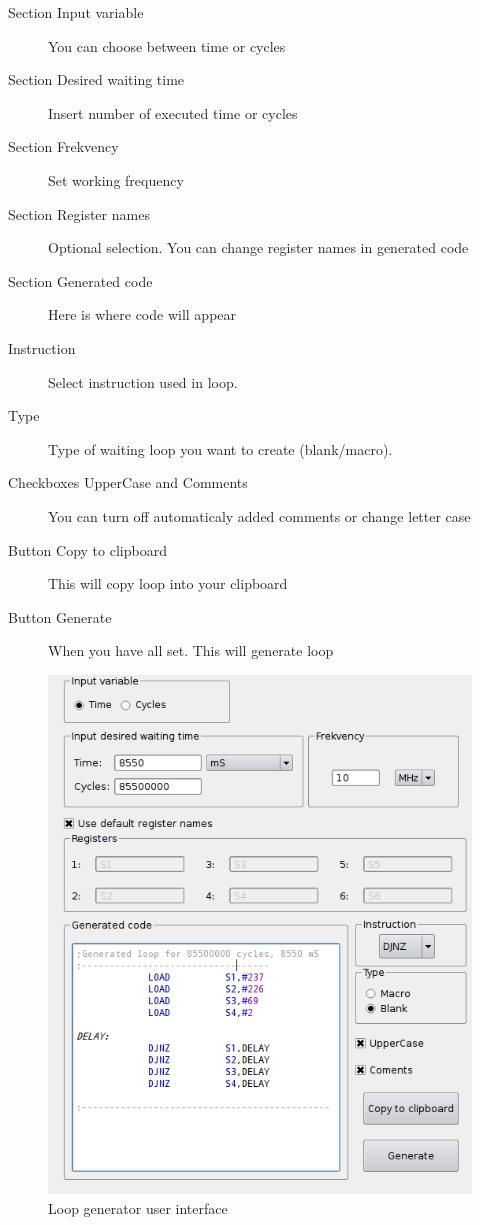     \begin{description}
        \item[Section Input variable] You can choose between time or cycles
        \item[Section Desired waiting time] Insert number of executed time or cycles
        \item[Section Frekvency] Set working frequency
        \item[Section Register names] Optional selection. You can change register names in generated code
        \item[Section Generated code] Here is where code will appear
        \item[Instruction] Select instruction used in loop.
        \item[Type] Type of waiting loop you want to create (blank/macro).
        \item[Checkboxes UpperCase and Comments]  You can turn off automaticaly added comments or change letter case
        \item[Button Copy to clipboard] This will copy loop into your clipboard
        \item[Button Generate] When you have all set. This will generate loop
    \end{description}

    \begin{figure}[h]
        \centering{}
        \includegraphics[width=.7\textwidth]{img/loop_gen.png}
        \caption{Loop generator user interface}
    \end{figure}

